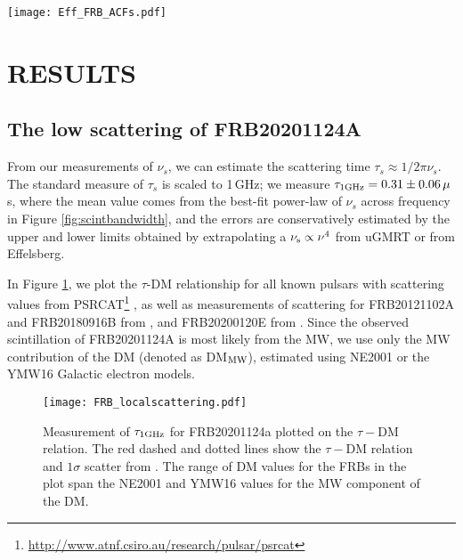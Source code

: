 \documentclass[fleqn,usenatbib]{mnras}
\newcommand{\frb}{FRB20201124A}
\newcommand{\rGC}{FRB20200120E}
\newcommand{\rthree}{FRB20180916B}
\newcommand{\rone}{FRB20121102A}
\begin{document}
\begin{figure*}
    \centering
    \texttt{[image: Eff\_FRB\_ACFs.pdf]} \\
    \caption{ Large-scale view (\textit{left}) and central region (\textit{middle}) of the 2D ACF of the Effelsberg bursts, and the corresponding secondary spectrum (\textit{right}), formed through a 2D FFT of the ACF.  The secondary spectrum is plotted in log scaling, and the colourbar extends two orders of magnitude. There are hints of diagonal stripes in the ACF, which result in an asymmetric power distribution in the secondary spectra}
    \label{fig:ACFs}
\end{figure*}

\section{RESULTS}
\label{sec:discussion}

\subsection{The low scattering of {\frb}}
\label{sec:underscattered}

From our measurements of $\nu_{s}$, we can estimate the scattering time $\tau_{s} \approx 1 / 2\pi\nu_{s}$.  The standard measure of $\tau_{s}$ is scaled to 1\,GHz;  we measure $\tau_{1\rm GHz}=0.31\pm0.06\,\mu$s, where the mean value comes from the best-fit power-law of $\nu_{s}$ across frequency in Figure \ref{fig:scintbandwidth}, and the errors are conservatively estimated by the upper and lower limits obtained by extrapolating a $\nu_{\rm s} \propto \nu^{4}$ from uGMRT or from Effelsberg. 

In Figure \ref{fig:taudm}, we plot the $\tau$-DM relationship for all known pulsars with scattering values from 
PSRCAT\footnote{\url{http://www.atnf.csiro.au/research/pulsar/psrcat}} \citep{manchester+05}, 
as well as measurements of scattering for {\rone} and {\rthree} from \citet{ocker+21}, and {\rGC} from \citet{nimmo+21b}. Since the observed scintillation of {\frb} is most likely from the MW, we use only the MW contribution of the DM (denoted as DM$_{\rm MW}$), estimated using NE2001 \citep{cordes+02} or the YMW16 \citep{yao+17} Galactic electron models.

\begin{figure}
    \centering
    \texttt{[image: FRB\_localscattering.pdf]} \\
    \vspace{-3mm}
    \caption{ Measurement of $\tau_{\rm 1 GHz}$ for FRB20201124a plotted on the $\tau-$DM relation.  The red dashed and dotted lines show the $\tau-$DM relation and $1\sigma$ scatter from . The range of DM values for the FRBs in the plot span the NE2001 and YMW16 values for the MW component of the DM. }
    \label{fig:taudm}
\end{figure}
\end{document}
